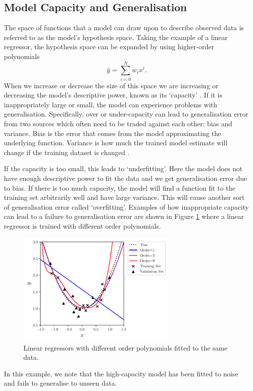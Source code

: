\subsection{Model Capacity and Generalisation}
The space of functions that a model can draw upon to describe observed data is referred to as the model's hypothesis space.
Taking the example of a linear regressor, the hypothesis space can be expanded by using higher-order polynomials
\begin{equation}
    \hat{y} = \sum_{i=0}^{N}w_{i}x^{i}.
\end{equation}
When we increase or decrease the size of this space we are increasing or decreasing the model's descriptive power, known as its `capacity' \cite{DeepLearningBook}. If it is inappropriately large or small, the model can experience problems with generalisation.
Specifically, over or under-capacity can lead to generalisation error from two sources which often need to be traded against each other: bias and variance. Bias is the error that comes from the model approximating the underlying function. Variance is how much the trained model estimate will change if the training dataset is changed \cite{DeepLearningBook}. 

If the capacity is too small, this leads to `underfitting'. Here the model does not have enough descriptive power to fit the data and we get generalisation error due to bias. If there is too much capacity, the model will find a function fit to the training set arbitrarily well and have large variance. This will cause another sort of generalisation error called `overfitting'. Examples of how inappropriate capacity can lead to a failure to generalisation error are shown in Figure \ref{fig:machine_learning:overfitting} where a linear regressor is trained with different order polynomials. 
\begin{figure}[h!]
    \centering
        \includegraphics[width=0.7\textwidth]{figures/machine_learning/capacity.pdf}
    \caption{Linear regressors with different order polynomials fitted to the same data. }
        \label{fig:machine_learning:overfitting}
\end{figure}
In this example, we note that the high-capacity model has been fitted to noise and fails to generalise to unseen data. 

